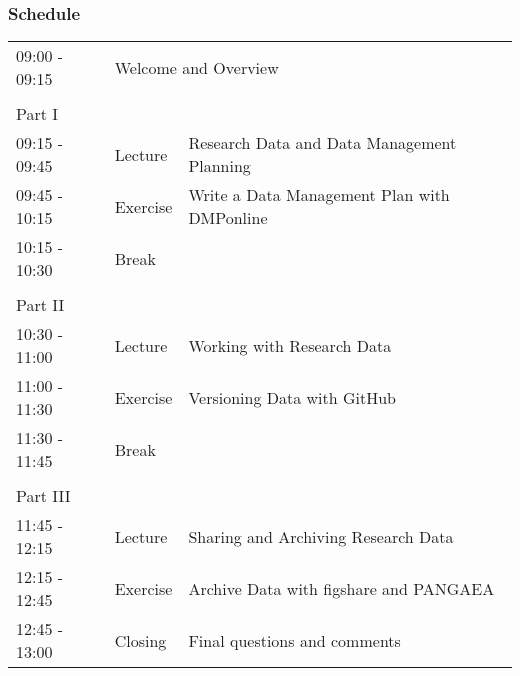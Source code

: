 \documentclass{beamer}
\begin{document}
\begin{frame}
  \frametitle{Schedule}
  \small
  \begin{center}
  \begin{tabular}{llp{7cm}}
  09:00 - 09:15 & \multicolumn{2}{l}{Welcome and Overview} \\
  & & \\	
  Part I & \\	
  \hline
  09:15 - 09:45 & Lecture & Research Data and Data Management Planning \\
  09:45 - 10:15 & Exercise & Write a Data Management Plan with DMPonline \\ 
  10:15 - 10:30 & Break & \\
  & & \\
  Part II & \\
  \hline 
  10:30 - 11:00 & Lecture & Working with Research Data \\
  11:00 - 11:30 & Exercise & Versioning Data with GitHub \\
  11:30 - 11:45 & Break & \\
  & & \\
  Part III & \\
  \hline 
  11:45 - 12:15 & Lecture & Sharing and Archiving Research Data \\
  12:15 - 12:45 & Exercise & Archive Data with figshare and PANGAEA \\
  12:45 - 13:00 & Closing & Final questions and comments \\
  \end{tabular}
  \end{center}
\end{frame}
\end{document}
